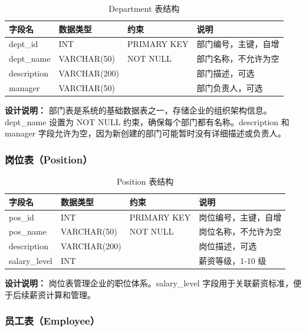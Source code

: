 \documentclass[12pt,a4paper]{article}
\begin{document}
\begin{table}[htbp]
  \centering
  \caption{Department 表结构}
  \renewcommand{\arraystretch}{1.3}
  \begin{tabularx}{\textwidth}{l l l X}
    \toprule
    \textbf{字段名} & \textbf{数据类型} & \textbf{约束} & \textbf{说明} \\
    \midrule
    dept\_id & INT & PRIMARY KEY & 部门编号，主键，自增 \\
    dept\_name & VARCHAR(50) & NOT NULL & 部门名称，不允许为空 \\
    description & VARCHAR(200) & & 部门描述，可选 \\
    manager & VARCHAR(50) & & 部门负责人，可选 \\
    \bottomrule
  \end{tabularx}
\end{table}

\textbf{设计说明：} 部门表是系统的基础数据表之一，存储企业的组织架构信息。dept\_name 设置为 NOT NULL 约束，确保每个部门都有名称。description 和 manager 字段允许为空，因为新创建的部门可能暂时没有详细描述或负责人。

\subsubsection{岗位表（Position）}

\begin{table}[htbp]
  \centering
  \caption{Position 表结构}
  \renewcommand{\arraystretch}{1.3}
  \begin{tabularx}{\textwidth}{l l l X}
    \toprule
    \textbf{字段名} & \textbf{数据类型} & \textbf{约束} & \textbf{说明} \\
    \midrule
    pos\_id & INT & PRIMARY KEY & 岗位编号，主键，自增 \\
    pos\_name & VARCHAR(50) & NOT NULL & 岗位名称，不允许为空 \\
    description & VARCHAR(200) & & 岗位描述，可选 \\
    salary\_level & INT & & 薪资等级，1-10 级 \\
    \bottomrule
  \end{tabularx}
\end{table}

\textbf{设计说明：} 岗位表管理企业的职位体系。salary\_level 字段用于关联薪资标准，便于后续薪资计算和管理。

\subsubsection{员工表（Employee）}
\end{document}
